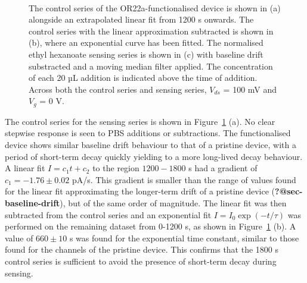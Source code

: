 \documentclass[
  a4paper,
]{scrbook}
\begin{document}
\begin{figure}
\begin{minipage}[t]{0.70\linewidth}
{{}

}

\end{minipage}%
%
\begin{minipage}[t]{0.15\linewidth}

{\centering 

~

}

\end{minipage}%

\caption{\label{fig-OR22a-series}The control series of the
OR22a-functionalised device is shown in (a) alongside an extrapolated
linear fit from 1200 s onwards. The control series with the linear
approximation subtracted is shown in (b), where an exponential curve has
been fitted. The normalised ethyl hexanoate sensing series is shown in
(c) with baseline drift substracted and a moving median filter applied.
The concentration of each 20 µL addition is indicated above the time of
addition. Across both the control series and sensing series, \(V_{ds}\)
= 100 mV and \(V_g\) = 0 V.}

\end{figure}

The control series for the sensing series is shown in
Figure~\ref{fig-OR22a-series} (a). No clear stepwise response is seen to
PBS additions or subtractions. The functionalised device shows similar
baseline drift behaviour to that of a pristine device, with a period of
short-term decay quickly yielding to a more long-lived decay behaviour.
A linear fit \(I = c_1t + c_2\) to the region \(1200-1800\) s had a
gradient of \(c_1 = -1.76\pm0.02\) pA/s. This gradient is smaller than
the range of values found for the linear fit approximating the
longer-term drift of a pristine device (\textbf{?@sec-baseline-drift}),
but of the same order of magnitude. The linear fit was then subtracted
from the control series and an exponential fit \(I = I_0\exp(-t/\tau)\)
was performed on the remaining dataset from 0-1200 s, as shown in
Figure~\ref{fig-OR22a-series} (b). A value of \(660 \pm 10\) s was found
for the exponential time constant, similar to those found for the
channels of the pristine device. This confirms that the 1800 s control
series is sufficient to avoid the presence of short-term decay during
sensing.
\end{document}
